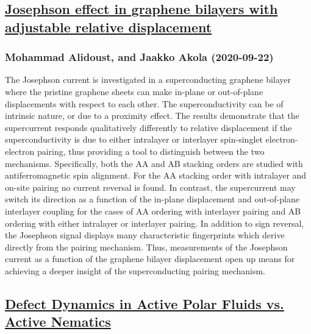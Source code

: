 {\subsection*{\href{http://arxiv.org/abs/2009.10730v1}{Josephson effect in graphene bilayers with adjustable relative  displacement}}
\subsubsection*{Mohammad Alidoust, and Jaakko Akola (2020-09-22)}
The Josephson current is investigated in a superconducting graphene bilayer
where the pristine graphene sheets can make in-plane or out-of-plane
displacements with respect to each other. The superconductivity can be of
intrinsic nature, or due to a proximity effect. The results demonstrate that
the supercurrent responds qualitatively differently to relative displacement if
the superconductivity is due to either intralayer or interlayer spin-singlet
electron-electron pairing, thus providing a tool to distinguish between the two
mechanisms. Specifically, both the AA and AB stacking orders are studied with
antiferromagnetic spin alignment. For the AA stacking order with intralayer and
on-site pairing no current reversal is found. In contrast, the supercurrent may
switch its direction as a function of the in-plane displacement and
out-of-plane interlayer coupling for the cases of AA ordering with interlayer
pairing and AB ordering with either intralayer or interlayer pairing. In
addition to sign reversal, the Josephson signal displays many characteristic
fingerprints which derive directly from the pairing mechanism. Thus,
measurements of the Josephson current as a function of the graphene bilayer
displacement open up means for achieving a deeper insight of the
superconducting pairing mechanism.

\subsection*{\href{http://arxiv.org/abs/2009.10723v1}{Defect Dynamics in Active Polar Fluids vs. Active Nematics}}
}
